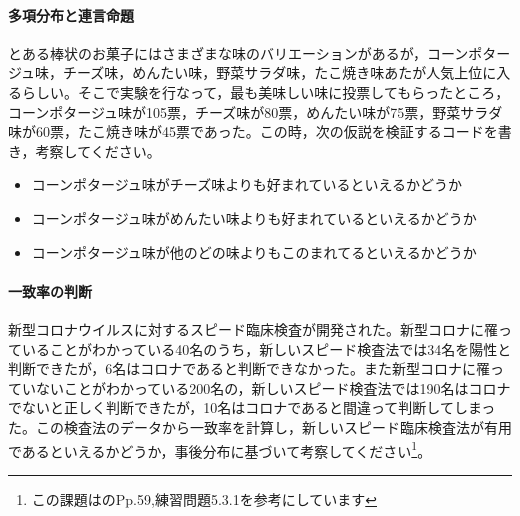 \documentclass{ltjsbook}
\begin{document}
\paragraph{多項分布と連言命題}とある棒状のお菓子にはさまざまな味のバリエーションがあるが，コーンポタージュ味，チーズ味，めんたい味，野菜サラダ味，たこ焼き味あたが人気上位に入るらしい。そこで実験を行なって，最も美味しい味に投票してもらったところ，コーンポタージュ味が105票，チーズ味が80票，めんたい味が75票，野菜サラダ味が60票，たこ焼き味が45票であった。この時，次の仮説を検証するコードを書き，考察してください。
\begin{itemize}
	\item コーンポタージュ味がチーズ味よりも好まれているといえるかどうか
	\item コーンポタージュ味がめんたい味よりも好まれているといえるかどうか
	\item コーンポタージュ味が他のどの味よりもこのまれてるといえるかどうか
\end{itemize}
\paragraph{一致率の判断}新型コロナウイルスに対するスピード臨床検査が開発された。新型コロナに罹っていることがわかっている40名のうち，新しいスピード検査法では34名を陽性と判断できたが，6名はコロナであると判断できなかった。また新型コロナに罹っていないことがわかっている200名の，新しいスピード検査法では190名はコロナでないと正しく判断できたが，10名はコロナであると間違って判断してしまった。この検査法のデータから一致率を計算し，新しいスピード臨床検査法が有用であるといえるかどうか，事後分布に基づいて考察してください\footnote{この課題は\textcite{Lee201709}のPp.59,練習問題5.3.1を参考にしています}。
\end{document}
